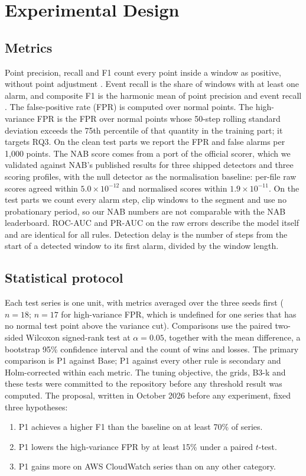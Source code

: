 \documentclass[conference]{IEEEtran}
\begin{document}
\section{Experimental Design}

\subsection{Metrics}
\label{sec:metrics}
Point precision, recall and F1 count every point inside a window as positive, without point adjustment \cite{kim2022}. Event recall is the share of windows with at least one alarm, and composite F1 is the harmonic mean of point precision and event recall \cite{garg2022}. The false-positive rate (FPR) is computed over normal points. The high-variance FPR is the FPR over normal points whose 50-step rolling standard deviation exceeds the 75th percentile of that quantity in the training part; it targets RQ3. On the clean test parts we report the FPR and false alarms per 1,000 points. The NAB score comes from a port of the official scorer, which we validated against NAB's published results for three shipped detectors and three scoring profiles, with the null detector as the normalisation baseline: per-file raw scores agreed within $5.0\times10^{-12}$ and normalised scores within $1.9\times10^{-11}$. On the test parts we count every alarm step, clip windows to the segment and use no probationary period, so our NAB numbers are not comparable with the NAB leaderboard. ROC-AUC and PR-AUC on the raw errors describe the model itself and are identical for all rules. Detection delay is the number of steps from the start of a detected window to its first alarm, divided by the window length.

\subsection{Statistical protocol}
Each test series is one unit, with metrics averaged over the three seeds first ($n = 18$; $n = 17$ for high-variance FPR, which is undefined for one series that has no normal test point above the variance cut). Comparisons use the paired two-sided Wilcoxon signed-rank test at $\alpha = 0.05$, together with the mean difference, a bootstrap 95\% confidence interval and the count of wins and losses. The primary comparison is P1 against Base; P1 against every other rule is secondary and Holm-corrected within each metric. The tuning objective, the grids, B3-k and these tests were committed to the repository before any threshold result was computed. The proposal, written in October 2026 before any experiment, fixed three hypotheses:
\begin{enumerate}
\item[H1] P1 achieves a higher F1 than the baseline on at least 70\% of series.
\item[H2] P1 lowers the high-variance FPR by at least 15\% under a paired $t$-test.
\item[H3] P1 gains more on AWS CloudWatch series than on any other category.
\end{enumerate}
\end{document}
